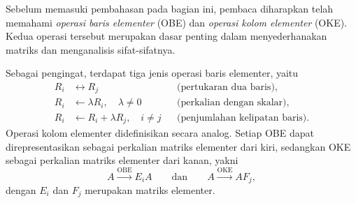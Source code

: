 Sebelum memasuki pembahasan pada bagian ini, pembaca
diharapkan telah memahami \textit{operasi baris elementer}
(OBE) dan \textit{operasi kolom elementer} (OKE).
Kedua operasi tersebut merupakan dasar penting dalam
menyederhanakan matriks dan menganalisis sifat-sifatnya.

Sebagai pengingat, terdapat tiga jenis operasi baris
elementer, yaitu
\[
    \begin{aligned}
        R_i & \leftrightarrow R_j
            & & \text{(pertukaran dua baris)}, \\
        R_i & \leftarrow \lambda R_i,\quad \lambda\neq 0
            & & \text{(perkalian dengan skalar)}, \\
        R_i & \leftarrow R_i+\lambda R_j,\quad i\neq j
            & & \text{(penjumlahan kelipatan baris)}.
    \end{aligned}
\]
Operasi kolom elementer didefinisikan secara analog.
Setiap OBE dapat direpresentasikan sebagai perkalian
matriks elementer dari kiri, sedangkan OKE sebagai
perkalian matriks elementer dari kanan, yakni
\[
    A\xrightarrow{\mathrm{OBE}} E_iA
    \qquad\text{dan}\qquad
    A\xrightarrow{\mathrm{OKE}} AF_j,
\]
dengan $E_i$ dan $F_j$ merupakan matriks elementer.
